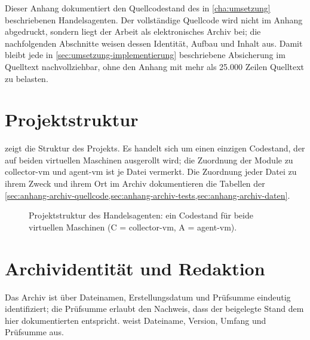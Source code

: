 

Dieser Anhang dokumentiert den Quellcodestand des in \cref{cha:umsetzung}
beschriebenen Handelsagenten. Der vollständige Quellcode wird nicht im Anhang
abgedruckt, sondern liegt der Arbeit als elektronisches Archiv bei; die
nachfolgenden Abschnitte weisen dessen Identität, Aufbau und Inhalt aus. Damit
bleibt jede in \cref{sec:umsetzung-implementierung} beschriebene Absicherung im
Quelltext nachvollziehbar, ohne den Anhang mit mehr als 25.000 Zeilen Quelltext
zu belasten.

\section{Projektstruktur}
\label{sec:anhang-projektstruktur}

 zeigt die Struktur des Projekts. Es handelt sich um
einen einzigen Codestand, der auf beiden virtuellen Maschinen ausgerollt wird;
die Zuordnung der Module zu collector-vm und agent-vm ist je Datei vermerkt.
Die Zuordnung jeder Datei zu ihrem Zweck und ihrem Ort im Archiv dokumentieren
die Tabellen der \cref{sec:anhang-archiv-quellcode,sec:anhang-archiv-tests,sec:anhang-archiv-daten}.

\begin{figure}[htbp]
    \centering
    
    \caption[Projektstruktur des Handelsagenten]{Projektstruktur des
        Handelsagenten: ein Codestand für beide virtuellen Maschinen
        (C = collector-vm, A = agent-vm).}
    \label{fig:projektstruktur}
\end{figure}

\section{Archividentität und Redaktion}
\label{sec:anhang-archiv-identitaet}

Das Archiv ist über Dateinamen, Erstellungsdatum und Prüfsumme eindeutig
identifiziert; die Prüfsumme erlaubt den Nachweis, dass der beigelegte Stand
dem hier dokumentierten entspricht.  weist
Dateiname, Version, Umfang und Prüfsumme aus.

